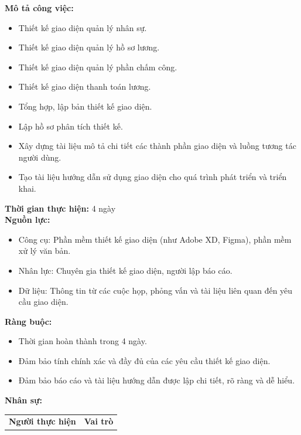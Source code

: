 {\begin{minipage}{\textwidth}
\begin{itemize}
    \end{itemize}
    \vspace{0.5cm}
    \noindent \textbf{Mô tả công việc:}
    \begin{itemize}
        \item Thiết kế giao diện quản lý nhân sự.
        \item Thiết kế giao diện quản lý hồ sơ lương.
        \item Thiết kế giao diện quản lý phần chấm công.
        \item Thiết kế giao diện thanh toán lương.
        \item Tổng hợp, lập bản thiết kế giao diện.
        \item Lập hồ sơ phân tích thiết kế.
        \item Xây dựng tài liệu mô tả chi tiết các thành phần giao diện và luồng tương tác người dùng.
        \item Tạo tài liệu hướng dẫn sử dụng giao diện cho quá trình phát triển và triển khai.
    \end{itemize}
    \vspace{0.5cm}
    \noindent \textbf{Thời gian thực hiện:} 4 ngày \\
    \noindent \textbf{Nguồn lực:}
    \begin{itemize}
        \item Công cụ: Phần mềm thiết kế giao diện (như Adobe XD, Figma), phần mềm xử lý văn bản.
        \item Nhân lực: Chuyên gia thiết kế giao diện, người lập báo cáo.
        \item Dữ liệu: Thông tin từ các cuộc họp, phỏng vấn và tài liệu liên quan đến yêu cầu giao diện.
    \end{itemize}
    \vspace{0.5cm}
    \noindent \textbf{Ràng buộc:}
    \begin{itemize}
        \item Thời gian hoàn thành trong 4 ngày.
        \item Đảm bảo tính chính xác và đầy đủ của các yêu cầu thiết kế giao diện.
        \item Đảm bảo báo cáo và tài liệu hướng dẫn được lập chi tiết, rõ ràng và dễ hiểu.
    \end{itemize}
    \vspace{0.5cm}
    \noindent \textbf{Nhân sự:}
    \begin{longtable}{|c|c|}
    \hline
    \textbf{Người thực hiện} & \textbf{Vai trò} \\

\end{longtable}
\end{minipage}}
